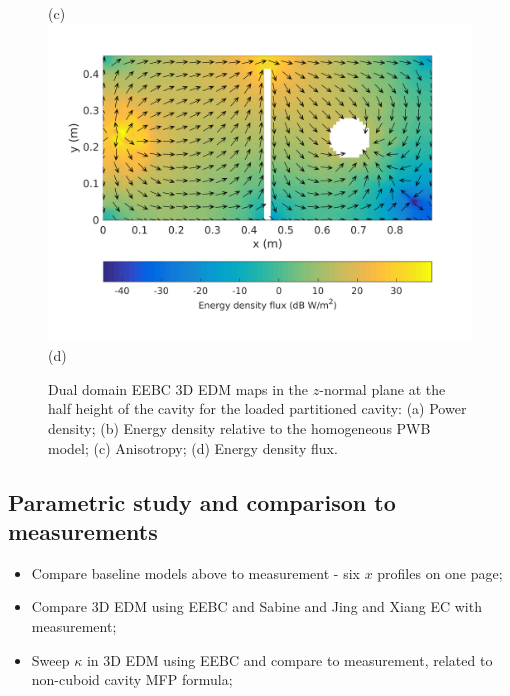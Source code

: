 \documentclass[a4paper]{article}
\numberwithin{equation}{section}
\begin{document}
\begin{figure}[hp]
\begin{center}
{\footnotesize (c)}\\
\vspace{2mm}
\includegraphics[trim={0 8mm 0 12mm},clip,width=0.52\linewidth]{figures/DDM-EEBC_3D_DL_EnergyDensityFluxMap}\\
{\footnotesize (d)}\\
\vspace{-2mm}
\caption{\label{fg:partcylddm_maps} Dual domain EEBC 3D EDM maps in the $z$-normal plane at the half height of the cavity for the 
loaded partitioned cavity: (a) Power density; (b) Energy density relative to the homogeneous PWB model;
(c) Anisotropy; (d) Energy density flux.}
\end{center}
\end{figure}

\subsection[Parametric study and comparison to measurements]{Parametric study and comparison to measurements}
\label{sc:res:para}

\begin{itemize}
 \item Compare baseline models above to measurement - six $x$ profiles on one page;
 \item Compare 3D EDM using EEBC and Sabine and Jing and Xiang EC with measurement;
 \item Sweep $\kappa$ in 3D EDM using EEBC and compare to measurement, related to non-cuboid cavity MFP formula; 
\end{itemize}
\end{document}
